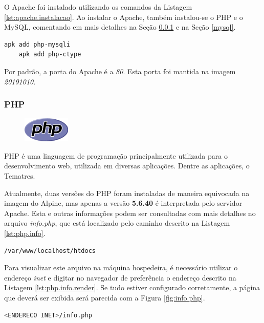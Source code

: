 O Apache foi instalado utilizando os comandos da Listagem \ref{lst:apache.instalacao}. Ao instalar o Apache, também instalou-se o PHP e o MySQL, comentando em mais detalhes na Seção \ref{php} e na Seção \ref{mysql}.

\begin{lstlisting}[language=bash, label=lst:apache.instalacao, caption=Instalando Apache.]
    apk add php-mysqli
    apk add php-ctype
\end{lstlisting}

Por padrão, a porta do Apache é a \textit{80}. Esta porta foi mantida na imagem \textit{20191010}.

\subsubsection{PHP}\label{php}
\begin{figure} %
    \centering
    \includegraphics[width=0.2\textwidth]{../images/php.png}
\end{figure}
PHP é uma linguagem de programação principalmente utilizada para o desenvolvimento web, utilizada em diversas aplicações. Dentre as aplicações, o Tematres.

Atualmente, duas versões do PHP foram instaladas de maneira equivocada na imagem do Alpine, mas apenas a versão \textbf{5.6.40} é interpretada pelo servidor Apache. Esta e outras informações podem ser consultadas com mais detalhes no arquivo \textit{info.php}, que está localizado pelo caminho descrito na Listagem \ref{lst:php.info}.

\begin{lstlisting}[language=bash, label=lst:php.info, caption=Caminho de info.php.]
    /var/www/localhost/htdocs
\end{lstlisting}

Para visualizar este arquivo na máquina hospedeira, é necessário utilizar o endereço \textit{inet} e digitar no navegador de preferência o endereço descrito na Listagem \ref{lst:php.info.render}. Se tudo estiver configurado corretamente, a página que deverá ser exibida será parecida com a Figura \ref{fig:info.php}.
\begin{lstlisting}[language=bash, label=lst:php.info.render, caption=Página info.php.]
    <ENDERECO INET>/info.php
\end{lstlisting}

